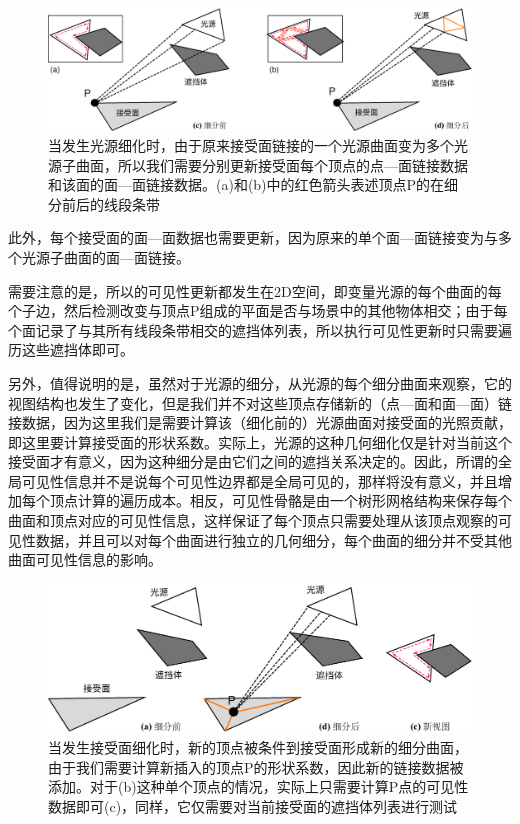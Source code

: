 \begin{figure}
\begin{fullwidth}
\includegraphics[width=\thewidth]{figures/r/source-refinement}
	\caption{当发生光源细化时，由于原来接受面链接的一个光源曲面变为多个光源子曲面，所以我们需要分别更新接受面每个顶点的点—面链接数据和该面的面—面链接数据。(a)和(b)中的红色箭头表述顶点P的在细分前后的线段条带}
	\label{f:r-source-refinement}
\end{fullwidth}
\end{figure}

此外，每个接受面的面—面数据也需要更新，因为原来的单个面—面链接变为与多个光源子曲面的面—面链接。

需要注意的是，所以的可见性更新都发生在2D空间，即变量光源的每个曲面的每个子边，然后检测改变与顶点P组成的平面是否与场景中的其他物体相交；由于每个面记录了与其所有线段条带相交的遮挡体列表，所以执行可见性更新时只需要遍历这些遮挡体即可。

另外，值得说明的是，虽然对于光源的细分，从光源的每个细分曲面来观察，它的视图结构也发生了变化，但是我们并不对这些顶点存储新的（点—面和面—面）链接数据，因为这里我们是需要计算该（细化前的）光源曲面对接受面的光照贡献，即这里要计算接受面的形状系数。实际上，光源的这种几何细化仅是针对当前这个接受面才有意义，因为这种细分是由它们之间的遮挡关系决定的。因此，所谓的全局可见性信息并不是说每个可见性边界都是全局可见的，那样将没有意义，并且增加每个顶点计算的遍历成本。相反，可见性骨骼是由一个树形网格结构来保存每个曲面和顶点对应的可见性信息，这样保证了每个顶点只需要处理从该顶点观察的可见性数据，并且可以对每个曲面进行独立的几何细分，每个曲面的细分并不受其他曲面可见性信息的影响。

\begin{figure}\includegraphics[width=1.\textwidth]{figures/r/receiver-refinement}
	\caption{当发生接受面细化时，新的顶点被条件到接受面形成新的细分曲面，由于我们需要计算新插入的顶点P的形状系数，因此新的链接数据被添加。对于(b)这种单个顶点的情况，实际上只需要计算P点的可见性数据即可(c)，同样，它仅需要对当前接受面的遮挡体列表进行测试}
	\label{f:r-receiver-refinement}
\end{figure}

